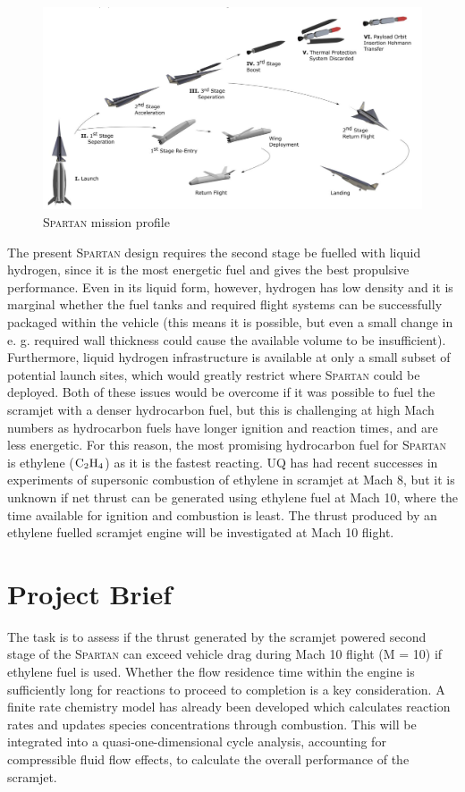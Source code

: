 \documentclass[a4paper]{article}
\begin{document}
\begin{figure}[H]
    \centering
    \includegraphics[width=0.9\linewidth]{part_2_img/spartan_overview.png}
    \caption{\textsc{Spartan} mission profile}
    \label{fig:mission_profile}
\end{figure}

The present \textsc{Spartan} design requires the second stage be fuelled with liquid hydrogen, since it is the most energetic fuel and gives the best propulsive performance. Even in its liquid form, however, hydrogen has low density and it is marginal whether the fuel tanks and required flight systems can be successfully packaged within the vehicle (this means it is possible, but even a small change in e. g. required wall thickness could cause the available volume to be insufficient). Furthermore, liquid hydrogen infrastructure is available at only a small subset of potential launch sites, which would greatly restrict where \textsc{Spartan} could be deployed. Both of these issues would be overcome if it was possible to fuel the scramjet with a denser hydrocarbon fuel, but this is challenging at high Mach numbers as hydrocarbon fuels have longer ignition and reaction times, and are less energetic. For this reason, the most promising hydrocarbon fuel for \textsc{Spartan} is ethylene (\(\ce{C2H4}\)) as it is the fastest reacting. UQ has had recent successes in experiments of supersonic combustion of ethylene in scramjet at Mach 8, but it is unknown if net thrust can be generated using ethylene fuel at Mach 10, where the time available for ignition and combustion is least. The thrust produced by an ethylene fuelled scramjet engine will be investigated at Mach 10 flight.

\section{Project Brief}
The task is to assess if the thrust generated by the scramjet powered second stage of the \textsc{Spartan} can exceed vehicle drag during Mach 10 flight (M = 10) if ethylene fuel is used. Whether the flow residence time within the engine is sufficiently long for reactions to proceed to completion is a key consideration. A finite rate chemistry model has already been developed which calculates reaction rates and updates species concentrations through combustion. This will be integrated into a quasi-one-dimensional cycle analysis, accounting for compressible fluid flow effects, to calculate the overall performance of the scramjet.
\end{document}
